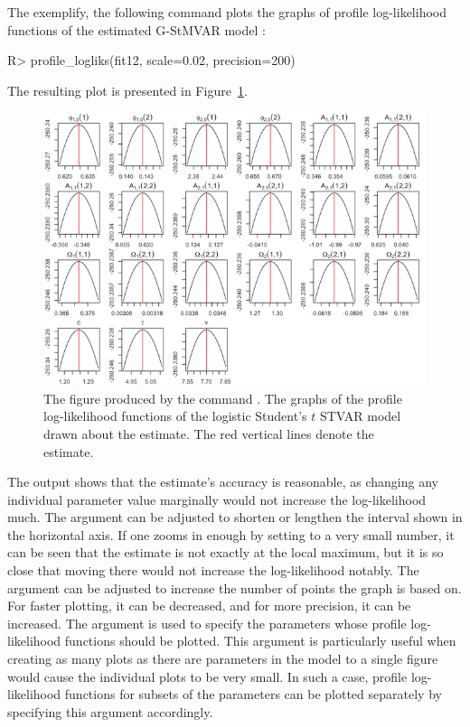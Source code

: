 \documentclass[nojss]{jss}
\begin{document}
The exemplify, the following command plots the graphs of profile log-likelihood functions of the estimated G-StMVAR model :
%
\begin{CodeChunk}
\begin{CodeInput}
R> profile_logliks(fit12, scale=0.02, precision=200)
\end{CodeInput}
\end{CodeChunk}
%
The resulting plot is presented in Figure~\ref{fig:proflogliks}.

\begin{figure}[t]
  \centering
  \includegraphics{figures/profilelogliks.png}
  \caption{The figure produced by the command . The graphs of the profile log-likelihood functions of the logistic Student's $t$ STVAR model drawn about the estimate. The red vertical lines denote the estimate.}
\label{fig:proflogliks}
\end{figure}

The output shows that the estimate's accuracy is reasonable, as changing any individual parameter value marginally would not increase the log-likelihood much. The argument  can be adjusted to shorten or lengthen the interval shown in the horizontal axis. If one zooms in enough by setting  to a very small number, it can be seen that the estimate is not exactly at the local maximum, but it is so close that moving there would not increase the log-likelihood notably. The argument  can be adjusted to increase the number of points the graph is based on. For faster plotting, it can be decreased, and for more precision, it can be increased. The argument  is used to specify the parameters whose profile log-likelihood functions should be plotted. This argument is particularly useful when creating as many plots as there are parameters in the model to a single figure would cause the individual plots to be very small. In such a case, profile log-likelihood functions for subsets of the parameters can be plotted separately by specifying this argument accordingly.
\end{document}
